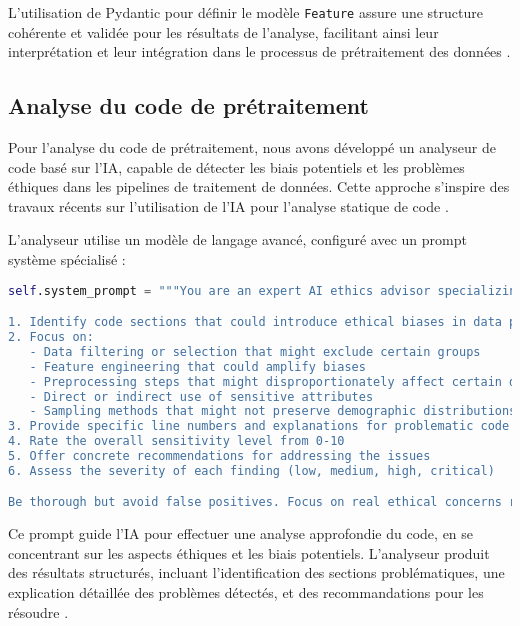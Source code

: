 L'utilisation de Pydantic pour définir le modèle \texttt{Feature} assure une structure cohérente et validée pour les résultats de l'analyse, facilitant ainsi leur interprétation et leur intégration dans le processus de prétraitement des données \cite{ref3}.

\subsection{Analyse du code de prétraitement}

Pour l'analyse du code de prétraitement, nous avons développé un analyseur de code basé sur l'IA, capable de détecter les biais potentiels et les problèmes éthiques dans les pipelines de traitement de données. Cette approche s'inspire des travaux récents sur l'utilisation de l'IA pour l'analyse statique de code \cite{ref4}.

L'analyseur utilise un modèle de langage avancé, configuré avec un prompt système spécialisé :

\begin{lstlisting}[language=Python,caption=Prompt système pour l'analyse éthique du code]
self.system_prompt = """You are an expert AI ethics advisor specializing in analyzing Python code for potential ethical biases. Your task is to:

1. Identify code sections that could introduce ethical biases in data processing or model training
2. Focus on:
   - Data filtering or selection that might exclude certain groups
   - Feature engineering that could amplify biases
   - Preprocessing steps that might disproportionately affect certain demographics
   - Direct or indirect use of sensitive attributes
   - Sampling methods that might not preserve demographic distributions
3. Provide specific line numbers and explanations for problematic code
4. Rate the overall sensitivity level from 0-10
5. Offer concrete recommendations for addressing the issues
6. Assess the severity of each finding (low, medium, high, critical)

Be thorough but avoid false positives. Focus on real ethical concerns rather than general code quality issues."""
\end{lstlisting}

Ce prompt guide l'IA pour effectuer une analyse approfondie du code, en se concentrant sur les aspects éthiques et les biais potentiels. L'analyseur produit des résultats structurés, incluant l'identification des sections problématiques, une explication détaillée des problèmes détectés, et des recommandations pour les résoudre \cite{ref5}.

